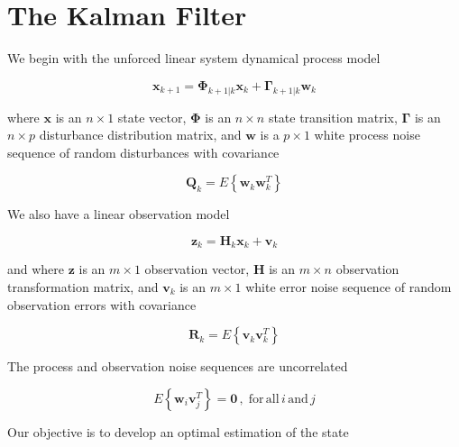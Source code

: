 \section{The Kalman Filter}
\label{The Kalman Filter}

We begin with the unforced linear system dynamical process model

\begin{equation}
    \mathbf{x}_{k+1} = \mathbf{\Phi}_{k+1|k} \mathbf{x}_k + \mathbf{\Gamma}_{k+1|k} \mathbf{w}_k
    \label{eq:unforced-linear-system-dynamical-model}
\end{equation}

where $\mathbf{x}$ is an $n \times 1$ state vector,
$\mathbf{\Phi}$ is an $n \times n$ state transition matrix,
$\mathbf{\Gamma}$ is an $n \times p$ disturbance distribution matrix,
and $\mathbf{w}$ is a $p \times 1$ white process noise sequence of random disturbances
with covariance

\begin{equation}
    \mathbf{Q}_k = E \left\{ \mathbf{w}_k \mathbf{w}_k^T \right\}
    \label{eq:process-noise-covariance}
\end{equation}

We also have a linear observation model

\begin{equation}
    \mathbf{z}_k = \mathbf{H}_k \mathbf{x}_k + \mathbf{v}_k
    \label{eq:linear-system-observation-model}
\end{equation}

and where $\mathbf{z}$ is an $m \times 1$ observation vector,
$\mathbf{H}$ is an $m \times n$ observation transformation matrix,
and $\mathbf{v}_k$ is an $m \times 1$ white error noise sequence of random observation
errors with covariance

\begin{equation}
    \mathbf{R}_k = E \left\{ \mathbf{v}_k \mathbf{v}_k^T \right\}
    \label{eq:observation-noise-covariance}
\end{equation}

The process and observation noise sequences are uncorrelated

\begin{equation*}
    E \left\{ \mathbf{w}_i \mathbf{v}_j^T \right\} = \mathbf{0} \, , \phantom{.} \mathrm{for} \, \mathrm{all} \, i \, \mathrm{and} \, j
\end{equation*}

Our objective is to develop an optimal estimation of the state

